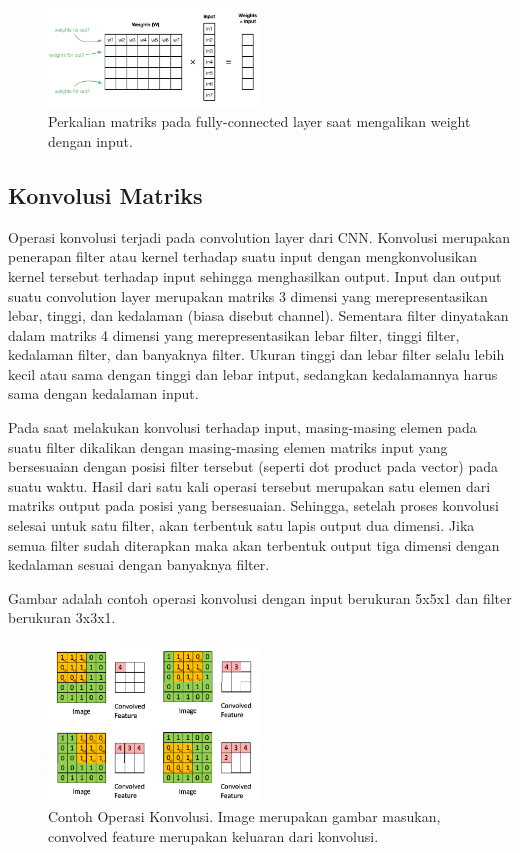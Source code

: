 \begin{figure}
	\centering
	\includegraphics[width=0.50\textwidth]
	{pics/matmul.png}
	\caption{Perkalian matriks pada fully-connected layer saat mengalikan weight dengan input.}
	\label{fig:matmul}
\end{figure}

\subsection{Konvolusi Matriks}
Operasi konvolusi terjadi pada convolution layer dari CNN. Konvolusi merupakan penerapan filter atau kernel terhadap suatu input dengan mengkonvolusikan kernel tersebut terhadap input sehingga menghasilkan output. Input dan output suatu convolution layer merupakan matriks 3 dimensi yang merepresentasikan lebar, tinggi, dan kedalaman (biasa disebut channel). Sementara filter dinyatakan dalam matriks 4 dimensi yang merepresentasikan lebar filter, tinggi filter, kedalaman filter, dan banyaknya filter. Ukuran tinggi dan lebar filter selalu lebih kecil atau sama dengan tinggi dan lebar intput, sedangkan kedalamannya harus sama dengan kedalaman input.

Pada saat melakukan konvolusi terhadap input, masing-masing elemen pada suatu filter dikalikan dengan masing-masing elemen matriks input yang bersesuaian dengan posisi filter tersebut (seperti dot product pada vector) pada suatu waktu. Hasil dari satu kali operasi tersebut merupakan satu elemen dari matriks output pada posisi yang bersesuaian. Sehingga, setelah proses konvolusi selesai untuk satu filter, akan terbentuk satu lapis output dua dimensi. Jika semua filter sudah diterapkan maka akan terbentuk output tiga dimensi dengan kedalaman sesuai dengan banyaknya filter.

Gambar adalah contoh operasi konvolusi dengan input berukuran 5x5x1 dan filter berukuran 3x3x1.

\begin{figure}
	\centering
	\includegraphics[width=0.50\textwidth]
	{pics/conv.png}
	\caption{Contoh Operasi Konvolusi. Image merupakan gambar masukan, convolved feature merupakan keluaran dari konvolusi.}
	\label{fig:conv}
\end{figure}

